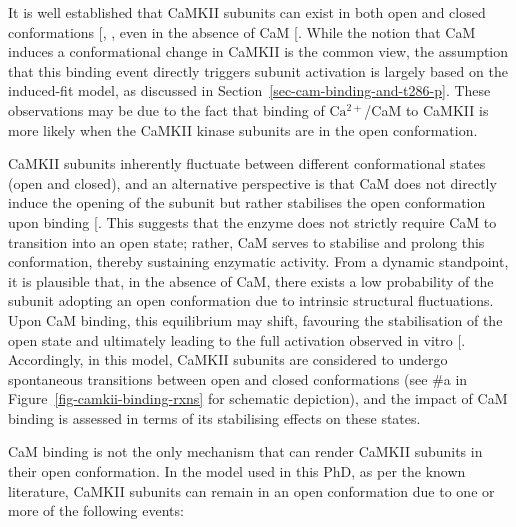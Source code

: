\documentclass[
  11pt,
  letterpaper,
]{scrreprt}
\begin{document}
It is well established that CaMKII subunits can exist in both open and
closed conformations {[},
\citeproc{ref-zhang2017Opposing}{459}{]}, even in the absence of CaM
{[}\citeproc{ref-asciutto2021Physicalc}{460}{]}. While the notion that
CaM induces a conformational change in CaMKII is the common view, the
assumption that this binding event directly triggers subunit activation
is largely based on the induced-fit model, as discussed in
Section~\ref{sec-cam-binding-and-t286-p}. These observations may be due
to the fact that binding of \(\mathrm{Ca^{2+}}\)/CaM to CaMKII is more
likely when the CaMKII kinase subunits are in the open conformation.

CaMKII subunits inherently fluctuate between different conformational
states (open and closed), and an alternative perspective is that CaM
does not directly induce the opening of the subunit but rather
stabilises the open conformation upon binding
{[}\citeproc{ref-asciutto2021Physicalc}{460}{]}. This suggests that the
enzyme does not strictly require CaM to transition into an open state;
rather, CaM serves to stabilise and prolong this conformation, thereby
sustaining enzymatic activity. From a dynamic standpoint, it is
plausible that, in the absence of CaM, there exists a low probability of
the subunit adopting an open conformation due to intrinsic structural
fluctuations. Upon CaM binding, this equilibrium may shift, favouring
the stabilisation of the open state and ultimately leading to the full
activation observed in vitro
{[}\citeproc{ref-asciutto2021Physicalc}{460}{]}. Accordingly, in this
model, CaMKII subunits are considered to undergo spontaneous transitions
between open and closed conformations (see \#a in
Figure~\ref{fig-camkii-binding-rxns} for schematic depiction), and the
impact of CaM binding is assessed in terms of its stabilising effects on
these states.

CaM binding is not the only mechanism that can render CaMKII subunits in
their open conformation. In the model used in this PhD, as per the known
literature, CaMKII subunits can remain in an open conformation due to
one or more of the following events:
\end{document}
